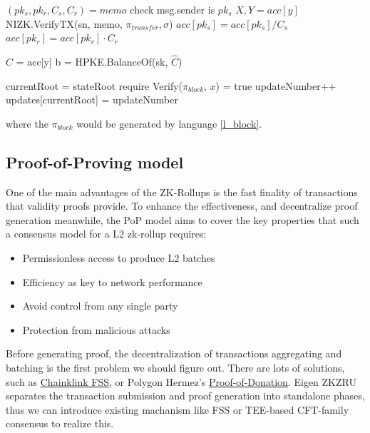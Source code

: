 \documentclass{article}
\begin{document}
\begin{algorithm}
\begin{multicols}{2}
{    $(pk_s, pk_r, C_s, C_r) = memo$ \;
    check msg.sender is $pk_s$ \;
    $X, Y = acc[y]$ \;
    NIZK.VerifyTX(sn, memo, $\pi_{transfer}, \sigma$) \;
    $acc[pk_s] = acc[pk_s]/C_s$ \;
    $acc[pk_r] = acc[pk_r]\cdot C_r$
  }

   {
    $\hat{C}$ = acc[y] \;
    b = HPKE.BalanceOf(sk, $\hat{C}$) \;
  }

   {
    currentRoot = stateRoot \;
    require Verify($\pi_{block}$, $x$) = true \;
    updateNumber++ \;
    updates[currentRoot] = updateNumber \;
  }
\end{multicols}

\end{algorithm}
where the $\pi_{block}$ would be generated by language \ref{l_block}.




\subsection{Proof-of-Proving model}

One of the main advantages of the ZK-Rollups is the fast finality of transactions that validity proofs provide. To enhance the effectiveness, and decentralize proof generation meanwhile, the PoP model aims to cover the key properties that such a consensus model for a L2 zk-rollup requires:
\begin{itemize}
    \item Permissionless access to produce L2 batches
    \item Efficiency as key to network performance
    \item Avoid control from any single party
    \item Protection from malicious attacks
\end{itemize}

Before generating proof, the decentralization of transactions aggregating and batching is the first problem we should figure out. There are lots of solutions, such as \href{https://blog.chain.link/chainlink-fair-sequencing-services-enabling-a-provably-fair-defi-ecosystem/}{Chainklink FSS}, or Polygon Hermez's \href{https://blog.hermez.io/introducing-proof-of-donation/}{Proof-of-Donation}. Eigen ZKZRU separates the transaction submission and proof generation into standalone phases, thus we can introduce existing machanism like FSS or TEE-based CFT-family consensus to realize this. 
\end{document}

